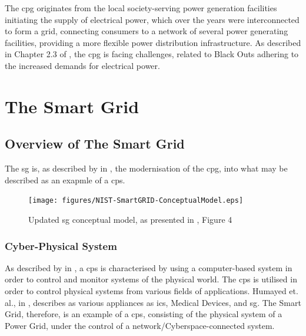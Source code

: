 The \acrlong{cpg} originates from the local society-serving power generation facilities initiating the supply of electrical power, which over the years were interconnected to form a grid, connecting consumers to a network of several power generating facilities, providing a more flexible power distribution infrastructure. 
As described in Chapter 2.3 of \cite{Rihan2018} %
, the \acrlong{cpg} is facing challenges, related to Black Outs adhering to the increased demands for electrical power. 


\section{The Smart Grid}
\subsection{Overview of The Smart Grid}

The \acrfull{sg} is, as described by \citeauthor{humayed2017cyber} in \cite{humayed2017cyber}, the modernisation of the \acrfull{cpg}, into what may be described as an exapmle of a \acrfull{cps}.


\begin{figure}[t]
\texttt{[image: figures/NIST-SmartGRID-ConceptualModel.eps]}
\caption[Smart Grid Conceptual Model]{Updated \acrlong{sg} conceptual model, as presented in \cite[p. 13]{gopstein2021nist}, Figure 4}
\label{fig:NIST-SmartGRID-ConceptualModel}
\end{figure}

\subsubsection{Cyber-Physical System}

As described by \citeauthor{humayed2017cyber} in \cite{humayed2017cyber}, a \acrfull{cps} is characterised by using a computer-based system in order to control and monitor systems of the physical world. The \acrshort{cps} is utilised in order to control physical systems from various fields of applications. Humayed et. al., in \cite{humayed2017cyber}, describes as various appliances as \acrfull{ics}, Medical Devices, and \acrlong{sg}.
The Smart Grid, therefore, is an example of a \acrfull{cps}, consisting of the physical system of a Power Grid, under the control of a network/Cyberspace-connected system. 

